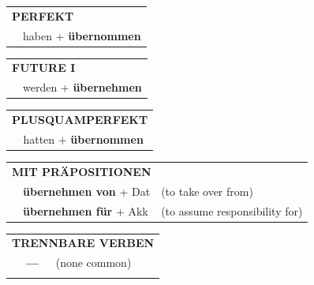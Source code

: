\documentclass[10pt,a4paper]{revtex4-2}
\begin{document}
\begin{verbbox}
    \vspace{10pt}

 \begin{tabular}{rl}
     \multicolumn{2}{l}{\textbf{PERFEKT}}\\
   & haben + \textbf{übernommen}\\
  \end{tabular}
\hfill
   \begin{tabular}{rl}
    \multicolumn{2}{l}{\textbf{FUTURE I} }\\
   & werden + \textbf{übernehmen}\\
  \end{tabular}
\hfill
   \begin{tabular}{rl}
      \multicolumn{2}{l}{\textbf{PLUSQUAMPERFEKT}}\\
   & hatten + \textbf{übernommen}\\
  \end{tabular}

   \vspace{10pt}

   \begin{tabular}{lll}
      \multicolumn{3}{l}{\textbf{MIT PRÄPOSITIONEN}}\\
& \textbf{übernehmen von} + Dat & (to take over from)\\
& \textbf{übernehmen für} + Akk & (to assume responsibility for)\\
\end{tabular}
  \hfill
   \begin{tabular}{lll}
      \multicolumn{3}{l}{\textbf{TRENNBARE VERBEN}}\\
 & \textbf{---} & (none common)\\
\vspace{10pt}
  \end{tabular}

  \vspace{-5pt}

\end{verbbox}
\end{document}
